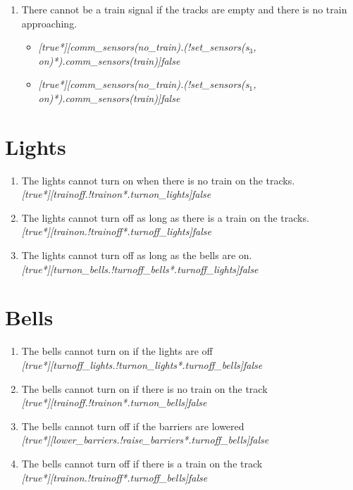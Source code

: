 \documentclass[final]{report}
\begin{document}
\begin{enumerate}
\item There cannot be a train signal if the tracks are empty and there is no train approaching.
\begin{itemize}
\item \textit{[true*][comm\_sensors(no\_train).(!set\_sensors(s$_{3}$, on)*).comm\_sensors(train)]false}
\item \textit{[true*][comm\_sensors(no\_train).(!set\_sensors(s$_{1}$, on)*).comm\_sensors(train)]false}
\end{itemize}

\end{enumerate}
\section{Lights}

\begin{enumerate}
\item The lights cannot turn on when there is no train on the tracks.\\
\textit{[true*][trainoff.!trainon*.turnon\_lights]false}

\item The lights cannot turn off as long as there is a train on the tracks.\\
\textit{[true*][trainon.!trainoff*.turnoff\_lights]false}

\item The lights cannot turn off as long as the bells are on.\\
\textit{[true*][turnon\_bells.!turnoff\_bells*.turnoff\_lights]false}
\end{enumerate}

\section{Bells}
\begin{enumerate}
\item The bells cannot turn on if the lights are off\\
\textit{[true*][turnoff\_lights.!turnon\_lights*.turnoff\_bells]false}
\item The bells cannot turn on if there is no train on the track\\
\textit{[true*][trainoff.!trainon*.turnon\_bells]false}
\item The bells cannot turn off if the barriers are lowered\\
\textit{[true*][lower\_barriers.!raise\_barriers*.turnoff\_bells]false}
\item The bells cannot turn off if there is a train on the track\\
\textit{[true*][trainon.!trainoff*.turnoff\_bells]false}
\end{enumerate}
\end{document}
